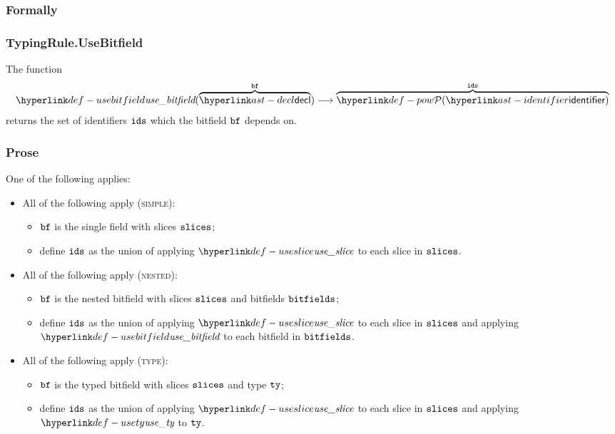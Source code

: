 \subsubsection{Formally}

\subsubsection{TypingRule.UseBitfield \label{sec:TypingRule.UseBitfield}}
\hypertarget{def-usebitfield}{}
The function
\[
\usebitfield(\overname{\decl}{\vbf}) \aslto \overname{\pow{\identifier}}{\ids}
\]
returns the set of identifiers $\texttt{ids}$ which the bitfield $\texttt{bf}$ depends on.

\subsubsection{Prose}
One of the following applies:
\begin{itemize}
  \item All of the following apply (\textsc{simple}):
  \begin{itemize}
    \item $\texttt{bf}$ is the single field with slices $\texttt{slices}$;
    \item define $\texttt{ids}$ as the union of applying $\useslice$ to each slice in $\texttt{slices}$.
  \end{itemize}

  \item All of the following apply (\textsc{nested}):
  \begin{itemize}
    \item $\texttt{bf}$ is the nested bitfield with slices $\texttt{slices}$ and bitfields $\texttt{bitfields}$;
    \item define $\texttt{ids}$ as the union of applying $\useslice$ to each slice in $\texttt{slices}$ and applying
          $\usebitfield$ to each bitfield in $\texttt{bitfields}$.
  \end{itemize}

  \item All of the following apply (\textsc{type}):
  \begin{itemize}
    \item $\texttt{bf}$ is the typed bitfield with slices $\texttt{slices}$ and type $\texttt{ty}$;
    \item define $\texttt{ids}$ as the union of applying $\useslice$ to each slice in $\texttt{slices}$ and applying
          $\usety$ to $\texttt{ty}$.
  \end{itemize}
\end{itemize}

